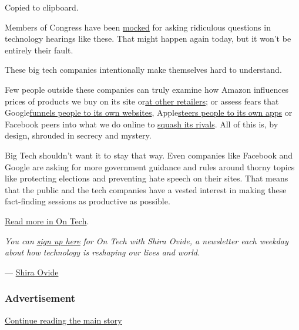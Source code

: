 Copied to clipboard.

Members of Congress have been
\href{https://www.thewrap.com/senator-orrin-hatch-facebook-biz-model-zuckerberg/}{mocked}
for asking ridiculous questions in technology hearings like these. That
might happen again today, but it won't be entirely their fault.

These big tech companies intentionally make themselves hard to
understand.

Few people outside these companies can truly examine how Amazon
influences prices of products we buy on its site
or\href{https://www.bloomberg.com/news/articles/2019-08-05/amazon-is-squeezing-sellers-that-offer-better-prices-on-walmart}{at
other retailers}; or assess fears that
Google\href{https://themarkup.org/google-the-giant/2020/07/28/google-search-results-prioritize-google-products-over-competitors}{funnels
people to its own websites},
Apple\href{https://www.nytimes.com/interactive/2019/09/09/technology/apple-app-store-competition.html}{steers
people to its own apps} or Facebook peers into what we do online to
\href{https://www.nytimes.com/2018/12/05/technology/facebook-emails-privacy-data.html}{squash
its rivals}. All of this is, by design, shrouded in secrecy and mystery.

Big Tech shouldn't want it to stay that way. Even companies like
Facebook and Google are asking for more government guidance and rules
around thorny topics like protecting elections and preventing hate
speech on their sites. That means that the public and the tech companies
have a vested interest in making these fact-finding sessions as
productive as possible.

\href{https://www.nytimes.com/2020/07/29/technology/congress-big-tech.html}{Read
more in On Tech}.

\emph{You can}
\href{https://www.nytimes.com/newsletters/signup/OT}{\emph{sign up
here}} \emph{for On Tech with Shira Ovide, a newsletter each weekday
about how technology is reshaping our lives and world.}

--- \href{https://www.nytimes.com/by/shira-ovide}{Shira Ovide}

\hypertarget{advertisement-2}{%
\subsubsection{Advertisement}\label{advertisement-2}}

\protect\hyperlink{after-dfp-ad-mid3}{Continue reading the main story}


